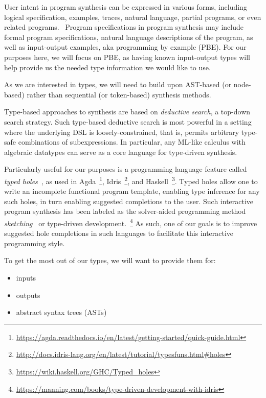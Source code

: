 \documentclass{article}
\begin{document}
User intent in program synthesis can be expressed in various forms, including logical specification, examples, traces, natural language, partial programs, or even related programs.~\citep{gulwani2017program}
Program specifications in program synthesis may include formal program specifications, natural language descriptions of the program, as well as input-output examples, aka programming by example (PBE).
For our purposes here, we will focus on PBE, as having known input-output types will help provide us the needed type information we would like to use.

As we are interested in types, we will need to build upon AST-based (or node-based) rather than sequential (or token-based) synthesis methods.

Type-based approaches to synthesis are based on \emph{deductive search}, a top-down search strategy.
Such type-based deductive search is most powerful in a setting where the underlying DSL is loosely-constrained, that is, permits arbitrary type-safe combinations of subexpressions. In particular, any ML-like calculus with algebraic datatypes can serve as a core language for type-driven synthesis.~\citep{gulwani2017program}

Particularly useful for our purposes is a programming language feature called \emph{typed holes}~\citep{hashimoto1997typed}, as used in Agda~\footnote{\url{https://agda.readthedocs.io/en/latest/getting-started/quick-guide.html}}, Idris~\footnote{\url{http://docs.idris-lang.org/en/latest/tutorial/typesfuns.html\#holes}}, and Haskell~\footnote{\url{https://wiki.haskell.org/GHC/Typed_holes}}. Typed holes allow one to write an incomplete functional program template, enabling type inference for any such holes, in turn enabling suggested completions to the user. Such interactive program synthesis has been labeled as the solver-aided programming method \emph{sketching}~\citep{gulwani2017program} or type-driven development.~\footnote{\url{https://manning.com/books/type-driven-development-with-idris}}
As such, one of our goals is to improve suggested hole completions in such languages to facilitate this interactive programming style.

To get the most out of our types, we will want to provide them for:
\begin{itemize}
    \item inputs
    \item outputs
    \item abstract syntax trees (ASTs)
\end{itemize}
\end{document}
